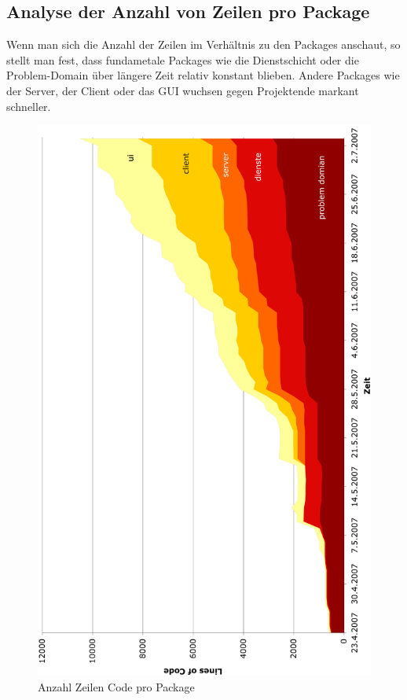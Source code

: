 \documentclass[12pt,halfparskip]{scrartcl}
\begin{document}
\subsection{Analyse der Anzahl von Zeilen pro Package}
Wenn man sich die Anzahl der Zeilen im Verhältnis zu den Packages anschaut, so stellt man fest, dass fundametale Packages wie die Dienstschicht oder die Problem-Domain über längere Zeit relativ konstant blieben. Andere Packages wie der Server, der Client oder das GUI wuchsen gegen Projektende markant schneller.
\begin{figure}[h]
	\centering
	\includegraphics[width=0.8 \textwidth]{anzahl_zeilen_pro_package}
	\caption{Anzahl Zeilen Code pro Package}
	\label{fig:anzahl_zeilen_pro_package}
\end{figure}
\end{document}
